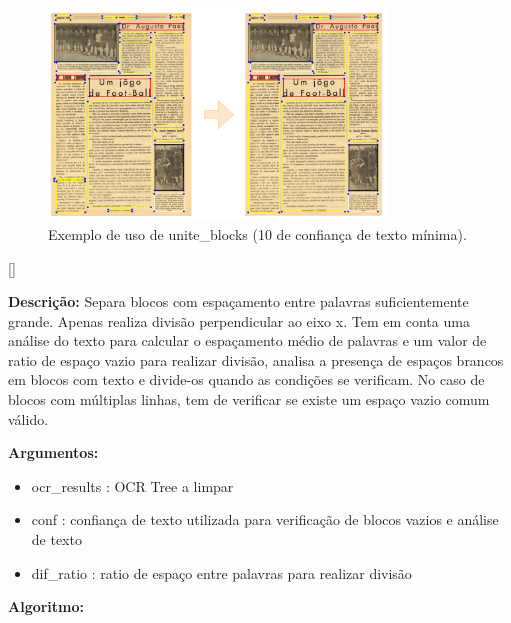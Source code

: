 \begin{figure}[H]
	\centering
	\includegraphics[width=0.8\textwidth]{images/ilustracoes/unite_blocks.png}
	\caption{Exemplo de uso de unite\_blocks (10 de confiança de texto mínima).}
	\label{fig:unite_blocks}
\end{figure}


[\normalsize]

\textbf{Descrição:} Separa blocos com espaçamento entre palavras suficientemente grande. Apenas realiza divisão perpendicular ao eixo x. Tem em conta uma análise do texto para calcular o espaçamento médio de palavras e um valor de ratio de espaço vazio para realizar divisão, analisa a presença de espaços brancos em blocos com texto e divide-os quando as condições se verificam. No caso de blocos com múltiplas linhas, tem de verificar se existe um espaço vazio comum válido.

\textbf{Argumentos:}
\begin{itemize}\setlength\itemsep{-0.3em}
	\item ocr\_results : OCR Tree a limpar
	\item conf : confiança de texto utilizada para verificação de blocos vazios e análise de texto
	\item dif\_ratio : ratio de espaço entre palavras para realizar divisão
\end{itemize}

\textbf{Algoritmo:}

